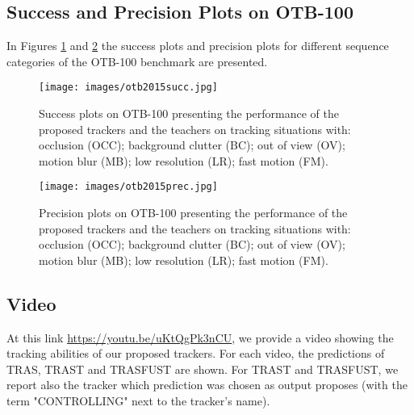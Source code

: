 \documentclass[runningheads]{llncs}
\makeatletter
\def\myalgonamefirst{TRAS\@\xspace}
\def\myalgonamesecond{TRAST\@\xspace}
\def\myalgonamethird{TRASFUST\@\xspace}
\makeatother
\begin{document}
\subsection{Success and Precision Plots on OTB-100}
In Figures \ref{fig:otb2015succ} and \ref{fig:otb2015prec} the success plots and precision plots for different sequence categories of the OTB-100 benchmark are presented. 

\begin{figure}[!htbp]
\begin{center}
\texttt{[image: images/otb2015succ.jpg]}
\end{center}
   \caption{Success plots on OTB-100 presenting the performance of the proposed trackers and the teachers on tracking situations with: occlusion (OCC); background clutter (BC); out of view (OV); motion blur (MB); low resolution (LR); fast motion (FM).}
\label{fig:otb2015succ}
\end{figure}

\begin{figure}[!htbp]
\begin{center}
\texttt{[image: images/otb2015prec.jpg]}
\end{center}
   \caption{Precision plots on OTB-100 presenting the performance of the proposed trackers and the teachers on tracking situations with: occlusion (OCC); background clutter (BC); out of view (OV); motion blur (MB); low resolution (LR); fast motion (FM).}
\label{fig:otb2015prec}
\end{figure}


\subsection{Video}
At this link \url{https://youtu.be/uKtQgPk3nCU}, we provide a video showing the tracking abilities of our proposed trackers. For each video, the predictions of \myalgonamefirst, \myalgonamesecond and \myalgonamethird are shown. For \myalgonamesecond and \myalgonamethird, we report also the tracker which prediction was chosen as output proposes (with the term "CONTROLLING" next to the tracker's name). 
\end{document}
